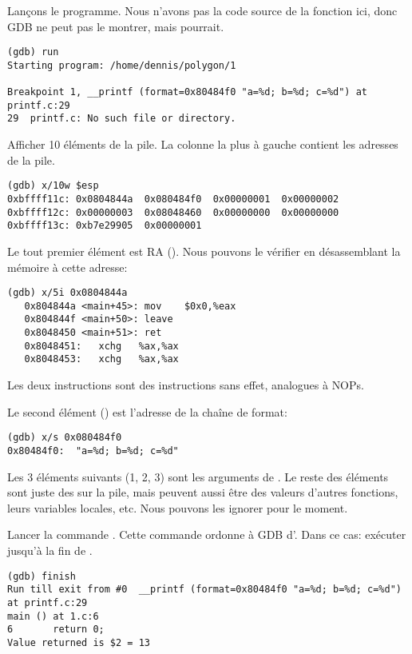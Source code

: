 Lançons le programme.
Nous n'avons pas la code source de la fonction \printf ici, donc \ac{GDB} ne peut
pas le montrer, mais pourrait.

\begin{lstlisting}
(gdb) run
Starting program: /home/dennis/polygon/1 

Breakpoint 1, __printf (format=0x80484f0 "a=%d; b=%d; c=%d") at printf.c:29
29	printf.c: No such file or directory.
\end{lstlisting}

Afficher 10 éléments de la pile. La colonne la plus à gauche contient les adresses
de la pile.

\begin{lstlisting}
(gdb) x/10w $esp
0xbffff11c:	0x0804844a	0x080484f0	0x00000001	0x00000002
0xbffff12c:	0x00000003	0x08048460	0x00000000	0x00000000
0xbffff13c:	0xb7e29905	0x00000001
\end{lstlisting}

Le tout premier élément est \ac{RA} ().
Nous pouvons le vérifier en désassemblant la mémoire à cette adresse:

\begin{lstlisting}[label=NOP_as_XCHG_example,style=customasmx86]
(gdb) x/5i 0x0804844a
   0x804844a <main+45>:	mov    $0x0,%eax
   0x804844f <main+50>:	leave  
   0x8048450 <main+51>:	ret    
   0x8048451:	xchg   %ax,%ax
   0x8048453:	xchg   %ax,%ax
\end{lstlisting}

Les deux instructions  sont des instructions sans effet, analogues à \ac{NOP}s.

Le second élément () est l'adresse de la chaîne de format:

\begin{lstlisting}
(gdb) x/s 0x080484f0
0x80484f0:	"a=%d; b=%d; c=%d"
\end{lstlisting}

Les 3 éléments suivants (1, 2, 3) sont les arguments de \printf.
Le reste des éléments sont juste des  sur la pile, mais peuvent aussi
être des valeurs d'autres fonctions, leurs variables locales, etc.
Nous pouvons les ignorer pour le moment.

Lancer la commande .
Cette commande ordonne à GDB d'.
Dans ce cas: exécuter jusqu'à la fin de \printf.

\begin{lstlisting}
(gdb) finish
Run till exit from #0  __printf (format=0x80484f0 "a=%d; b=%d; c=%d") at printf.c:29
main () at 1.c:6
6		return 0;
Value returned is $2 = 13
\end{lstlisting}

